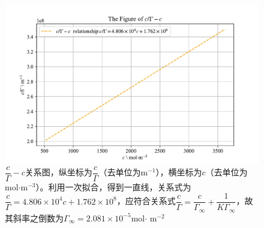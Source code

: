 \documentclass[UTF8,AutoFakeBold,a4paper]{article}
\begin{document}
\begin{figure}[h]
	\centering
	\includegraphics[scale=0.8]{Figure3}
	\caption{$\dfrac{c}{\varGamma}-c$关系图，纵坐标为$\dfrac{c}{\varGamma}$（去单位为m$^{-1}$），横坐标为$c$（去单位为 mol$\cdot $m$^{-3}$）。利用一次拟合，得到一直线，关系式为\textcolor[rgb]{0.54,0.13,0.33}{$\dfrac{c}{\varGamma} = 4.806 \times 10^{4}c + 1.762 \times 10^{8}$}，应符合关系式\textcolor[rgb]{0.07,0.36,0.57}{$\dfrac{c}{\varGamma} = \dfrac{c}{\varGamma_{\infty}}+\dfrac{1}{K\varGamma_{\infty}}$}，故其斜率之倒数为$\varGamma_{\infty} = 2.081 \times10^{-5}$mol$\cdot$ m$^{-2}$}
	\label{fi4}
\end{figure}
\end{document}
